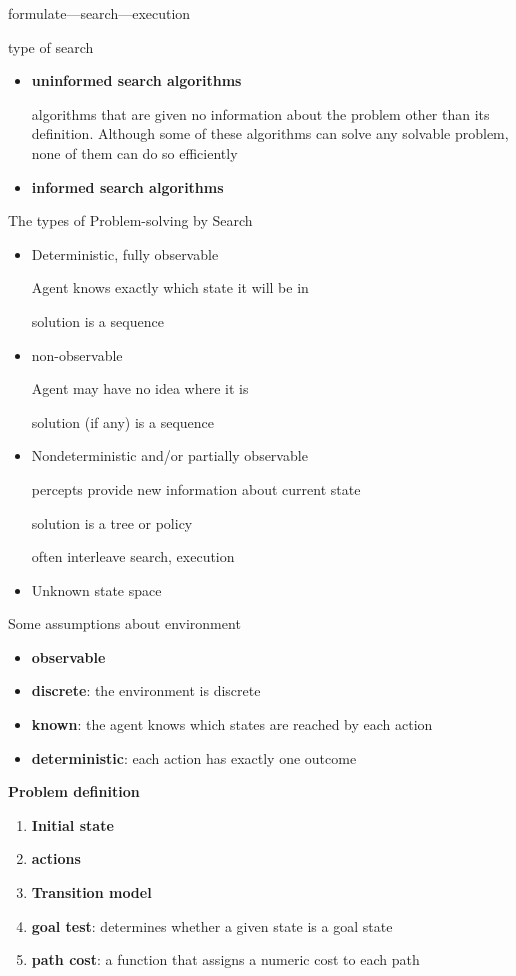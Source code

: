 \documentclass[11pt]{article}
\begin{document}
formulate—search—execution


type of search
\begin{itemize}
\item \textbf{uninformed search algorithms}

algorithms that are given no information about the problem other
than its definition. Although some of these algorithms can solve
any solvable problem, none of them can do so efficiently
\item \textbf{informed search algorithms}
\end{itemize}


The types of Problem-solving by Search
\begin{itemize}
\item Deterministic, fully observable

Agent knows exactly which state it will be in

solution is a sequence
\item non-observable

Agent may have no idea where it is

solution (if any) is a sequence
\item Nondeterministic and/or partially observable

percepts provide new information about current state

solution is a tree or policy

often interleave search, execution
\item Unknown state space
\end{itemize}


Some assumptions about environment
\begin{itemize}
\item \textbf{observable}
\item \textbf{discrete}: the environment is discrete
\item \textbf{known}: the agent knows which states are reached by each action
\item \textbf{deterministic}: each action has exactly one outcome
\end{itemize}


\textbf{Problem definition}
\begin{enumerate}
\item \textbf{Initial state}
\item \textbf{actions}
\item \textbf{Transition model}
\item \textbf{goal test}: determines whether a given state is a goal state
\item \textbf{path cost}: a function that assigns a numeric cost to each path
\end{enumerate}
\end{document}
